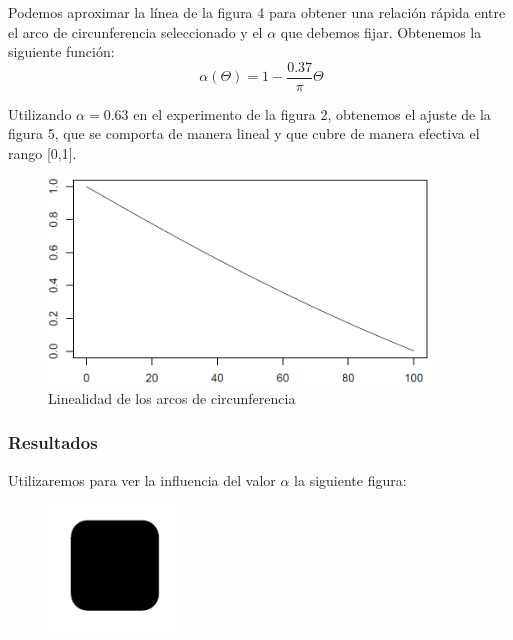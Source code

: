 Podemos aproximar la línea de la figura 4 para obtener una relación rápida entre el arco de circunferencia seleccionado y el $\alpha$ que debemos fijar. Obtenemos la siguiente función:\\

\[
\ \alpha(\Theta) = 1- \frac{0.37}{\pi} \Theta
\]

Utilizando $\alpha = 0.63$ en el experimento de la figura 2, obtenemos el ajuste de la figura 5, que se comporta de manera lineal y que cubre de manera efectiva el rango [0,1].\\


\begin{figure}[H]
\begin{center}

\includegraphics[width=0.9\textwidth]{img/Ajuste-alfa.png}
\end{center}

\caption{Linealidad de los arcos de circunferencia}
\end{figure}

\subsubsection{Resultados}

Utilizaremos para ver la influencia del valor $\alpha$ la siguiente figura:\\

\begin{figure}[H]
\begin{center}

\includegraphics[width=0.3\textwidth]{img/device3-1.png}
\end{center}

\end{figure}

